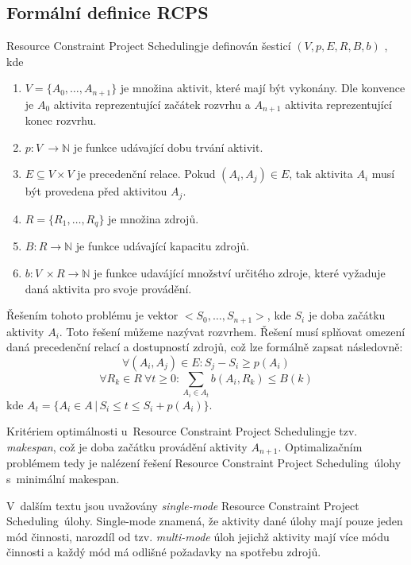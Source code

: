 \documentclass[a4paper, 12pt]{article}
\newcommand{\rcps}[0]{Resource Constraint Project Scheduling}
\begin{document}
\subsection{Formální definice RCPS}
\rcps je definován šesticí $(V, p, E, R, B, b)$ \cite{artigues:2007}, kde
\begin{enumerate}
    \item $V=\{A_0, \ldots, A_{n+1}\}$ je množina aktivit, které mají být vykonány.
    Dle konvence je $A_0$ aktivita reprezentující začátek rozvrhu a $A_{n+1}$ aktivita reprezentující konec rozvrhu.
    \item $p: V~\rightarrow \mathbb{N}$ je funkce udávající dobu trvání aktivit.
    \item $E \subseteq V\times V$ je precedenční relace.
    Pokud $(A_i, A_j) \in E$, tak aktivita $A_i$ musí být provedena před aktivitou $A_j$.
    \item $R=\{R_1,\ldots,R_q\}$ je množina zdrojů.
    \item $B: R \rightarrow \mathbb{N}$ je funkce udávající kapacitu zdrojů.
    \item $b: V~\times R \rightarrow \mathbb{N}$ je funkce udavájící množství určitého zdroje, které vyžaduje daná aktivita pro
    svoje provádění.
\end{enumerate}

Řešením tohoto problému je vektor $<S_0,\ldots,S_{n+1}>$, kde $S_i$ je doba začátku aktivity $A_i$.
Toto řešení můžeme nazývat rozvrhem.
Řešení musí splňovat omezení daná precedenční relací a dostupností zdrojů, což lze formálně zapsat následovně:
\begin{equation}
 \forall (A_i,A_j) \in E: S_j - S_i \geq p(A_i)
\end{equation}
\begin{equation}
 \forall R_k \in R\ \forall t \geq 0: \sum_{A_i \in A_t} b(A_i, R_k) \leq B(k)
\end{equation}
kde $A_t=\{A_i \in A\,|\, S_i \leq t \leq S_i+p(A_i)\}$.

Kritériem optimálnosti u~\rcps je tzv. \emph{makespan}, což je doba začátku provádění aktivity $A_{n+1}$.
Optimalizačním problémem tedy je nalézení řešení \rcps\ úlohy s~minimální makespan.

V~dalším textu jsou uvažovány \emph{single-mode} \rcps\ úlohy.
Single-mode znamená, že aktivity dané úlohy mají pouze jeden mód činnosti,
narozdíl od tzv. \emph{multi-mode} úloh jejichž aktivity mají více módu činnosti
a každý mód má odlišné požadavky na spotřebu zdrojů.
\end{document}
